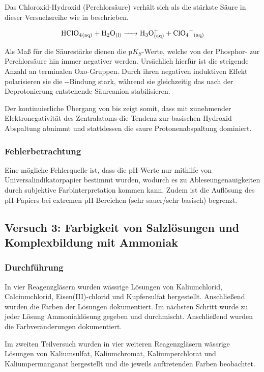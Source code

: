 Das Chloroxid-Hydroxid (Perchlorsäure) verhält sich als die stärkste Säure in dieser Versuchsreihe wie in  beschrieben.

\begin{equation}
    \ce{HClO4_{(aq)} + H2O_{(l)} -> H3O^+_{(aq)} + ClO4^-_{(aq)}}
    \label{eq:perchlorsaeure}
\end{equation}

Als Maß für die Säurestärke dienen die p$K_S$-Werte, welche von der Phosphor- zur Perchlorsäure hin immer negativer werden. Ursächlich hierfür ist die steigende Anzahl an terminalen Oxo-Gruppen. Durch ihren negativen induktiven Effekt polarisieren sie die --Bindung stark, während sie gleichzeitig das nach der Deprotonierung entstehende Säureanion stabilisieren. \cite{pKs_Periodensystem}

Der kontinuierliche Übergang von  bis  zeigt somit, dass mit zunehmender Elektronegativität des Zentralatoms die Tendenz zur basischen Hydroxid-Abspaltung abnimmt und stattdessen die saure Protonenabspaltung dominiert. \cite{skript}

\subsubsection{Fehlerbetrachtung}
Eine mögliche Fehlerquelle ist, dass die pH-Werte nur mithilfe von Universalindikatorpapier bestimmt wurden, wodurch es zu Ableseungenauigkeiten durch subjektive Farbinterpretation kommen kann. Zudem ist die Auflösung des pH-Papiers bei extremen pH-Bereichen (sehr sauer/sehr basisch) begrenzt.

\subsection{Versuch 3: Farbigkeit von Salzlösungen und Komplexbildung mit Ammoniak}

\subsubsection{Durchführung}
In vier Reagenzgläsern wurden wässrige Lösungen von Kaliumchlorid, Calciumchlorid, Eisen(III)-chlorid und Kupfersulfat hergestellt. Anschließend wurden die Farben der Lösungen dokumentiert. Im nächsten Schritt wurde zu jeder Lösung Ammoniaklösung gegeben und durchmischt. Anschließend wurden die Farbveränderungen dokumentiert. \cite{skript}

Im zweiten Teilversuch wurden in vier weiteren Reagenzgläsern wässrige Lösungen von Kaliumsulfat, Kaliumchromat, Kaliumperchlorat und Kaliumpermanganat hergestellt und die jeweils auftretenden Farben beobachtet.

